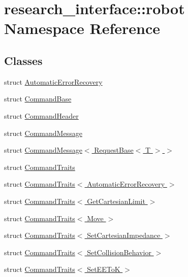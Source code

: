 \hypertarget{namespaceresearch__interface_1_1robot}{}\section{research\+\_\+interface\+:\+:robot Namespace Reference}
\label{namespaceresearch__interface_1_1robot}
\subsection*{Classes}
\begin{DoxyCompactItemize}
\item 
struct \hyperlink{structresearch__interface_1_1robot_1_1AutomaticErrorRecovery}{Automatic\+Error\+Recovery}
\item 
struct \hyperlink{structresearch__interface_1_1robot_1_1CommandBase}{Command\+Base}
\item 
struct \hyperlink{structresearch__interface_1_1robot_1_1CommandHeader}{Command\+Header}
\item 
struct \hyperlink{structresearch__interface_1_1robot_1_1CommandMessage}{Command\+Message}
\item 
struct \hyperlink{structresearch__interface_1_1robot_1_1CommandMessage_3_01RequestBase_3_01T_01_4_01_4}{Command\+Message$<$ Request\+Base$<$ T $>$ $>$}
\item 
struct \hyperlink{structresearch__interface_1_1robot_1_1CommandTraits}{Command\+Traits}
\item 
struct \hyperlink{structresearch__interface_1_1robot_1_1CommandTraits_3_01AutomaticErrorRecovery_01_4}{Command\+Traits$<$ Automatic\+Error\+Recovery $>$}
\item 
struct \hyperlink{structresearch__interface_1_1robot_1_1CommandTraits_3_01GetCartesianLimit_01_4}{Command\+Traits$<$ Get\+Cartesian\+Limit $>$}
\item 
struct \hyperlink{structresearch__interface_1_1robot_1_1CommandTraits_3_01Move_01_4}{Command\+Traits$<$ Move $>$}
\item 
struct \hyperlink{structresearch__interface_1_1robot_1_1CommandTraits_3_01SetCartesianImpedance_01_4}{Command\+Traits$<$ Set\+Cartesian\+Impedance $>$}
\item 
struct \hyperlink{structresearch__interface_1_1robot_1_1CommandTraits_3_01SetCollisionBehavior_01_4}{Command\+Traits$<$ Set\+Collision\+Behavior $>$}
\item 
struct \hyperlink{structresearch__interface_1_1robot_1_1CommandTraits_3_01SetEEToK_01_4}{Command\+Traits$<$ Set\+E\+E\+To\+K $>$}

\end{DoxyCompactItemize}

